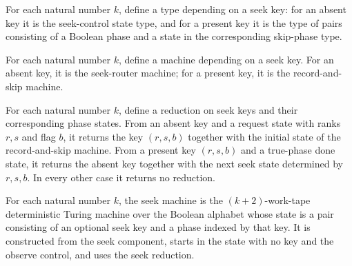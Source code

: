 \begin{definition}
\label{Turing.StepBlock.SeekPh}
\leanok
{}
For each natural number $k$, define a type depending on a seek key: for an absent key it
is the seek-control state type, and for a present key it is the type of pairs consisting
of a Boolean phase and a state in the corresponding skip-phase type.
\end{definition}

\begin{definition}
\label{Turing.StepBlock.seekPart}
\leanok
{}
For each natural number $k$, define a machine depending on a seek key. For an absent
key, it is the seek-router machine; for a present key, it is the record-and-skip
machine.
\end{definition}

\begin{definition}
\label{Turing.StepBlock.seekRed}
\leanok
{}
For each natural number $k$, define a reduction on seek keys and their corresponding
phase states. From an absent key and a request state with ranks $r,s$ and flag $b$, it
returns the key $(r,s,b)$ together with the initial state of the record-and-skip
machine. From a present key $(r,s,b)$ and a true-phase done state, it returns the absent
key together with the next seek state determined by $r,s,b$. In every other case it
returns no reduction.
\end{definition}

\begin{definition}
\label{Turing.StepBlock.seekTM}
\leanok
{}
For each natural number $k$, the seek machine is the $(k+2)$-work-tape deterministic
Turing machine over the Boolean alphabet whose state is a pair consisting of an optional
seek key and a phase indexed by that key. It is constructed from the seek component,
starts in the state with no key and the observe control, and uses the seek reduction.
\end{definition}

